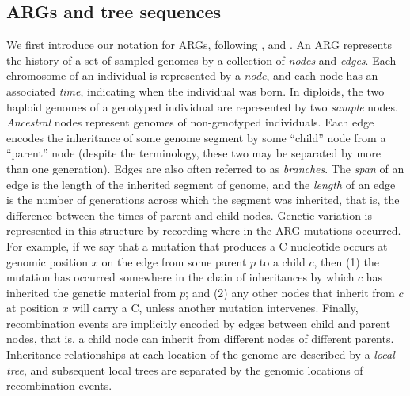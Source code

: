



\subsection{ARGs and tree sequences}

We first introduce our notation for ARGs, following
\citet{kelleher2016efficient, kelleher2018efficient}, and \citet{wong2023general}.
%
An ARG represents the history of a set of sampled genomes
by a collection of \emph{nodes} and \emph{edges}.
%
Each chromosome of an individual is represented by a \emph{node},
and each node has an associated \emph{time},
indicating when the individual was born.
%
In diploids, the two haploid genomes of a genotyped individual are represented
by two \emph{sample} nodes.
%
\emph{Ancestral} nodes represent genomes of non-genotyped individuals.
%
Each edge encodes the inheritance of some genome segment
by some ``child'' node from a ``parent'' node
(despite the terminology, these two may be separated by more than one generation).
%
Edges are also often referred to as \emph{branches}.
%
The \emph{span} of an edge is the length of the inherited segment of genome,
and the \emph{length} of an edge is the number of generations across which
the segment was inherited, that is, the difference between the times of parent and child nodes.
%
Genetic variation is represented in this structure
by recording where in the ARG mutations occurred.
%
For example, if we say that a mutation that produces a C nucleotide
occurs at genomic position $x$ on the edge from some parent $p$
to a child $c$, then
(1) the mutation has occurred somewhere in the chain of inheritances
by which $c$ has inherited the genetic material from $p$; and
(2) any other nodes that inherit from $c$ at position $x$ will carry a C,
unless another mutation intervenes.
%
Finally, recombination events are implicitly encoded
by edges between child and parent nodes, that is,
a child node can inherit from different nodes of different parents.
%
Inheritance relationships at each location of the genome
are described by a \emph{local tree},
and subsequent local trees are separated by the genomic locations
of recombination events.

